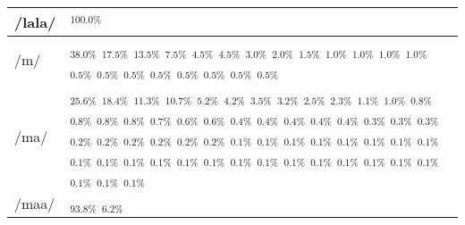 \documentclass{article}
\begin{document}
\begin{longtable}{|l|p{}|}
/lala/ & \textIndus{}$_{100.0\%}$ \\ \hline
/m/ & \textIndus{}$_{38.0\%}$ \quad \textIndus{}$_{17.5\%}$ \quad \textIndus{}$_{13.5\%}$ \quad \textIndus{}$_{7.5\%}$ \quad \textIndus{}$_{4.5\%}$ \quad \textIndus{}$_{4.5\%}$ \quad \textIndus{}$_{3.0\%}$ \quad \textIndus{}$_{2.0\%}$ \quad \textIndus{}$_{1.5\%}$ \quad \textIndus{}$_{1.0\%}$ \quad \textIndus{}$_{1.0\%}$ \quad \textIndus{}$_{1.0\%}$ \quad \textIndus{}$_{1.0\%}$ \quad \textIndus{}$_{0.5\%}$ \quad \textIndus{}$_{0.5\%}$ \quad \textIndus{}$_{0.5\%}$ \quad \textIndus{}$_{0.5\%}$ \quad \textIndus{}$_{0.5\%}$ \quad \textIndus{}$_{0.5\%}$ \quad \textIndus{}$_{0.5\%}$ \quad \textIndus{}$_{0.5\%}$ \\ \hline
/ma/ & \textIndus{}$_{25.6\%}$ \quad \textIndus{}$_{18.4\%}$ \quad \textIndus{}$_{11.3\%}$ \quad \textIndus{}$_{10.7\%}$ \quad \textIndus{}$_{5.2\%}$ \quad \textIndus{}$_{4.2\%}$ \quad \textIndus{}$_{3.5\%}$ \quad \textIndus{}$_{3.2\%}$ \quad \textIndus{}$_{2.5\%}$ \quad \textIndus{}$_{2.3\%}$ \quad \textIndus{}$_{1.1\%}$ \quad \textIndus{}$_{1.0\%}$ \quad \textIndus{}$_{0.8\%}$ \quad \textIndus{}$_{0.8\%}$ \quad \textIndus{}$_{0.8\%}$ \quad \textIndus{}$_{0.8\%}$ \quad \textIndus{}$_{0.7\%}$ \quad \textIndus{}$_{0.6\%}$ \quad \textIndus{}$_{0.6\%}$ \quad \textIndus{}$_{0.4\%}$ \quad \textIndus{}$_{0.4\%}$ \quad \textIndus{}$_{0.4\%}$ \quad \textIndus{}$_{0.4\%}$ \quad \textIndus{}$_{0.4\%}$ \quad \textIndus{}$_{0.3\%}$ \quad \textIndus{}$_{0.3\%}$ \quad \textIndus{}$_{0.3\%}$ \quad \textIndus{}$_{0.2\%}$ \quad \textIndus{}$_{0.2\%}$ \quad \textIndus{}$_{0.2\%}$ \quad \textIndus{}$_{0.2\%}$ \quad \textIndus{}$_{0.2\%}$ \quad \textIndus{}$_{0.2\%}$ \quad \textIndus{}$_{0.1\%}$ \quad \textIndus{}$_{0.1\%}$ \quad \textIndus{}$_{0.1\%}$ \quad \textIndus{}$_{0.1\%}$ \quad \textIndus{}$_{0.1\%}$ \quad \textIndus{}$_{0.1\%}$ \quad \textIndus{}$_{0.1\%}$ \quad \textIndus{}$_{0.1\%}$ \quad \textIndus{}$_{0.1\%}$ \quad \textIndus{}$_{0.1\%}$ \quad \textIndus{}$_{0.1\%}$ \quad \textIndus{}$_{0.1\%}$ \quad \textIndus{}$_{0.1\%}$ \quad \textIndus{}$_{0.1\%}$ \quad \textIndus{}$_{0.1\%}$ \quad \textIndus{}$_{0.1\%}$ \quad \textIndus{}$_{0.1\%}$ \quad \textIndus{}$_{0.1\%}$ \quad \textIndus{}$_{0.1\%}$ \quad \textIndus{}$_{0.1\%}$ \quad \textIndus{}$_{0.1\%}$ \quad \textIndus{}$_{0.1\%}$ \quad \textIndus{}$_{0.1\%}$ \quad \textIndus{}$_{0.1\%}$ \quad \textIndus{}$_{0.1\%}$ \\ \hline
/maa/ & \textIndus{}$_{93.8\%}$ \quad \textIndus{}$_{6.2\%}$ \\ \hline

\end{longtable}
\end{document}
